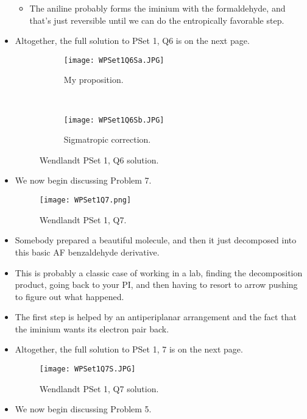\documentclass[../notes.tex]{subfiles}
\begin{document}
\begin{itemize}
\begin{itemize}
        \item The aniline probably forms the iminium with the formaldehyde, and that's just reversible until we can do the entropically favorable step.
    \end{itemize}
    \item Altogether, the full solution to PSet 1, Q6 is on the next page.
    \begin{figure}[H]
        \centering
        \begin{subfigure}[b]{\linewidth}
            \centering
            \texttt{[image: WPSet1Q6Sa.JPG]}
            \caption{My proposition.}
            \label{fig:WPSet1Q6Sa}
        \end{subfigure}\\[2em]
        \begin{subfigure}[b]{\linewidth}
            \centering
            \texttt{[image: WPSet1Q6Sb.JPG]}
            \caption{Sigmatropic correction.}
            \label{fig:WPSet1Q6Sb}
        \end{subfigure}
        \caption{Wendlandt PSet 1, Q6 solution.}
        \label{fig:WPSet1Q6S}
    \end{figure}
    \pagebreak
    \item We now begin discussing Problem 7.
    \begin{figure}[h!]
        \centering
        \texttt{[image: WPSet1Q7.png]}
        \caption{Wendlandt PSet 1, Q7.}
        \label{fig:WPSet1Q7}
    \end{figure}
    \item Somebody prepared a beautiful molecule, and then it just decomposed into this basic AF benzaldehyde derivative.
    \item This is probably a classic case of working in a lab, finding the decomposition product, going back to your PI, and then having to resort to arrow pushing to figure out what happened.
    \item The first step is helped by an antiperiplanar arrangement and the fact that the iminium wants its electron pair back.
    \item Altogether, the full solution to PSet 1, 7 is on the next page.
    \begin{figure}[h!]
        \centering
        \texttt{[image: WPSet1Q7S.JPG]}
        \caption{Wendlandt PSet 1, Q7 solution.}
        \label{fig:WPSet1Q7S}
    \end{figure}
    \pagebreak
    \item We now begin discussing Problem 5.

\end{itemize}
\end{document}
